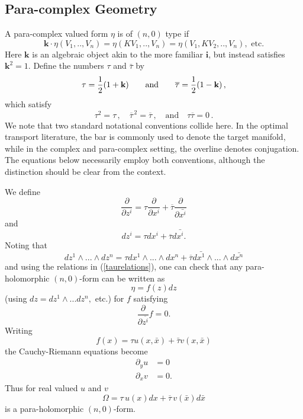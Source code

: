 \documentclass[12pt,letterpaper]{amsart}%
\numberwithin{mycounter}{section}
\theoremstyle{plain}
\numberwithin{equation}{section}
\theoremstyle{definition}
\begin{document}
\subsection{Para-complex Geometry} A para-complex valued form $\eta$ is of $\left(  n,0\right)  $ type if
\[
\mathbf{k}\cdot\eta(V_{1},..,V_{n})=\eta(KV_{1},..,V_{n})=\eta(V_{1}%
,KV_{2},..,V_{n}), \mbox{  etc.}
\]
Here $\mathbf{k}$ is an algebraic object akin to the more familiar
$\mathbf{i}$, but instead satisfies $\mathbf{k}^{2}=1.$ Define the numbers $\tau$ and $\bar{\tau}$ by
\begin{equation}\label{definetau}
    \tau = \frac{1}{2}(1+\textrm{\bf k}) \qquad \textrm{and} \qquad \overline{\tau}=\frac{1}{2}(1-\textrm{\bf k})\,,
\end{equation}
which satisfy
\begin{equation} \label{taurelations}
    \tau^2=\tau\,, \quad \overline{\tau}^{\,2}=\overline{\tau}\,, \quad \textrm{and} \quad \tau\overline{\tau}=0\,.
\end{equation}
We note that two standard notational conventions collide here. In the optimal transport literature, the bar is commonly used to denote the target manifold, while in the complex and para-complex setting, the overline denotes conjugation. The equations below necessarily employ both conventions, although the distinction should be clear from the context.

We define  
\[
\frac{\partial}{\partial{z^i}}=\tau\frac{\partial}{\partial{x^i}} +\overline{\tau}\frac{\partial}{\partial{\bar{x^i}}}%
\] and 
\[
d{z^i}=\tau d{x^i}+\overline{\tau} d{\bar{x^i}}.
\]
Noting that 
\[
d{z^1}\wedge ...\wedge d{z^n}=\tau d{x^1}\wedge ...\wedge d{x^n}+\overline{\tau} d\bar{x^1}\wedge ...\wedge d\bar{x^n} %
\]
and using the relations in (\ref{taurelations}), one can check that any para-holomorphic $(n,0)$-form can be written as 
\[  \eta= f(z) d{z}
\] (using $dz=dz^{1}\wedge...dz^{n},$ etc.) for $f$ satisfying 
 \[ 
\frac{\partial}{\partial\overline{z^i}} f = 0.
 \] 
 Writing 
 \[  
 f(x) = \tau u(x, \bar{x}) + \bar{\tau} v(x, \bar{x}) 
 \] the Cauchy-Riemann equations become
\begin{align*}
\partial_{y}u  & =0\\
\partial_{x}v  & =0.
\end{align*}
Thus 
for real valued $u$ and $v$  
\begin{equation} \label{defom}
\Omega=\tau \, u(x) dx+\overline{\tau}\,v(\bar{x})d\bar{x}%
\end{equation}
is a para-holomorphic $\left(  n,0\right)$-form. 
\end{document}
